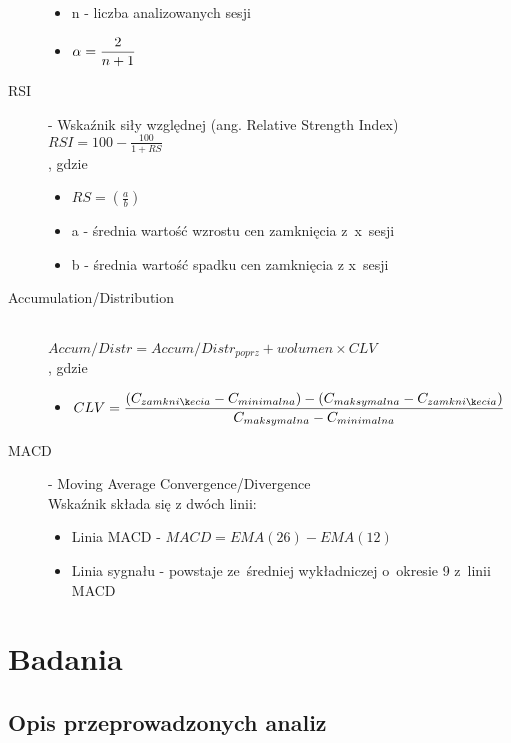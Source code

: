 \begin{description}
\begin{itemize}
				\item n - liczba analizowanych sesji
				\item $\displaystyle \alpha={2\over{n+1}}$
			\end{itemize}
	\item[RSI] - Wskaźnik siły względnej (ang. Relative Strength Index) \hfill \\
		$\displaystyle RSI = 100 - \frac{100}{1+RS}$ \\
		, gdzie \hfill
			\begin{itemize}
				\item $\displaystyle RS = \left( \frac {a}{b} \right)$
				\item a - średnia wartość wzrostu cen zamknięcia z~x~sesji
				\item b - średnia wartość spadku cen zamknięcia z x~sesji
			\end{itemize}
	\item[Accumulation/Distribution] \hfill \\
		$\displaystyle Accum/Distr = Accum/Distr_{poprz} + wolumen \times CLV$ \\
		, gdzie \hfill
			\begin{itemize}
				\item $\displaystyle CLV = { (C_{zamknięcia} - C_{minimalna}) - (C_{maksymalna} - C_{zamknięcia}) \over C_{maksymalna} - C_{minimalna}}$
			\end{itemize}
	\item[MACD] - Moving Average Convergence/Divergence \hfill \\
		Wskaźnik składa się z dwóch linii:
		\begin{itemize}
			\item Linia MACD - $\displaystyle MACD = EMA(26) - EMA(12)$
			\item Linia sygnału - powstaje ze~średniej wykładniczej o~okresie 9 z~linii MACD
		\end{itemize}
\end{description}

\section{Badania}\label{sec:badania}

\subsection{Opis przeprowadzonych analiz}

